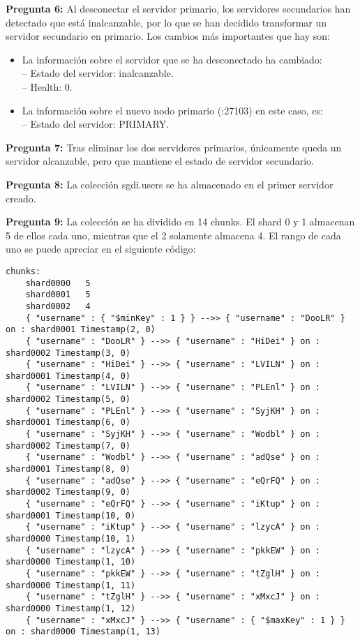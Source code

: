 \documentclass[11pt,a4paper]{article}
\begin{document}
\textbf{Pregunta 6:} Al desconectar el servidor primario, los servidores
secundarios han detectado que está inalcanzable, por lo que se han decidido
transformar un servidor secundario en primario. Los cambios más importantes
que hay son:
\begin{itemize}
\item La información sobre el servidor que se ha desconectado ha cambiado:\\
  -- Estado del servidor: inalcanzable.\\
  -- Health: 0.
\item La información sobre el nuevo nodo primario (:27103) en este caso,
  es:\\
  -- Estado del servidor: PRIMARY.
\end{itemize}

\textbf{Pregunta 7:}
Tras eliminar los dos servidores primarios, únicamente queda un servidor
alcanzable, pero que mantiene el estado de servidor secundario.

\textbf{Pregunta 8:}
La colección sgdi.users se ha almacenado en el primer servidor creado.

\textbf{Pregunta 9:}
La colección se ha dividido en 14 chunks. El shard 0 y 1 almacenan 5 de
ellos cada uno, mientras que el 2 solamente almacena 4.
El rango de cada uno se puede apreciar en el siguiente código:
\begin{lstlisting}[basicstyle=\tiny\ttfamily]
chunks:
    shard0000	5
    shard0001	5
    shard0002	4
    { "username" : { "$minKey" : 1 } } -->> { "username" : "DooLR" } on : shard0001 Timestamp(2, 0) 
    { "username" : "DooLR" } -->> { "username" : "HiDei" } on : shard0002 Timestamp(3, 0) 
    { "username" : "HiDei" } -->> { "username" : "LVILN" } on : shard0001 Timestamp(4, 0) 
    { "username" : "LVILN" } -->> { "username" : "PLEnl" } on : shard0002 Timestamp(5, 0) 
    { "username" : "PLEnl" } -->> { "username" : "SyjKH" } on : shard0001 Timestamp(6, 0) 
    { "username" : "SyjKH" } -->> { "username" : "Wodbl" } on : shard0002 Timestamp(7, 0) 
    { "username" : "Wodbl" } -->> { "username" : "adQse" } on : shard0001 Timestamp(8, 0) 
    { "username" : "adQse" } -->> { "username" : "eQrFQ" } on : shard0002 Timestamp(9, 0) 
    { "username" : "eQrFQ" } -->> { "username" : "iKtup" } on : shard0001 Timestamp(10, 0) 
    { "username" : "iKtup" } -->> { "username" : "lzycA" } on : shard0000 Timestamp(10, 1) 
    { "username" : "lzycA" } -->> { "username" : "pkkEW" } on : shard0000 Timestamp(1, 10) 
    { "username" : "pkkEW" } -->> { "username" : "tZglH" } on : shard0000 Timestamp(1, 11) 
    { "username" : "tZglH" } -->> { "username" : "xMxcJ" } on : shard0000 Timestamp(1, 12) 
    { "username" : "xMxcJ" } -->> { "username" : { "$maxKey" : 1 } } on : shard0000 Timestamp(1, 13) 

\end{lstlisting}
\end{document}
